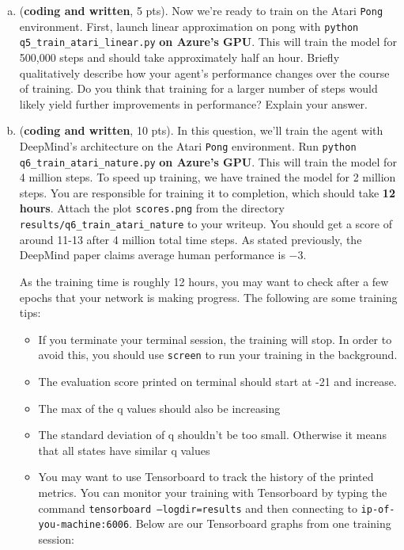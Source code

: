 \documentclass{article}
\newif\ifanswers
\newenvironment{myitemize}
{ \begin{itemize}
    \setlength{\itemsep}{0pt}
    \setlength{\parskip}{0pt}
    \setlength{\parsep}{0pt}     }
  { \end{itemize}                  }
\newcommand{\ifans}[1]{\ifanswers \color{red} \textbf{Solution: } #1 \color{black} \else {} \fi}
\begin{document}
\begin{enumerate}[(a)]
\item (\textbf{coding and written}, 5 pts). Now we're ready to train on the Atari \texttt{Pong} environment. First, launch linear approximation on pong with \texttt{python q5\_train\_atari\_linear.py} \textbf{on Azure's GPU}. This will train the model for 500,000 steps and should take approximately half an hour.  Briefly qualitatively describe how your agent's performance changes over the course of training. Do you think that training for a larger number of steps would likely yield further improvements in performance? Explain your answer.

\ifans{
}

\item (\textbf{coding and written}, 10 pts). In this question, we'll train the agent with DeepMind's architecture on the Atari \texttt{Pong} environment. Run \texttt{python q6\_train\_atari\_nature.py} \textbf{on Azure's GPU}.  This will train the model for 4 million steps. To speed up training, we have trained the model for 2 million steps. You are responsible for training it to completion, which should take \textbf{12 hours}. Attach the plot \texttt{scores.png} from the directory \texttt{results/q6\_train\_atari\_nature} to your writeup.
You should get a score of around 11-13 after 4 million total time steps.  As stated previously, the DeepMind paper claims average human performance is $ -3 $.


\ifans{
}

As the training time is roughly 12 hours, you may want to check after a few epochs that your network is making progress.  The following are some training tips:

\begin{myitemize}
\item If you terminate your terminal session, the training will stop.  In order to avoid this, you should use \texttt{screen} to run your training in the background.
\item The evaluation score printed on terminal should start at -21 and increase.
\item The max of the q values should also be increasing
\item The standard deviation of q shouldn't be too small. Otherwise it means that all states have similar q values
\item You may want to use Tensorboard to track the history of the printed metrics. You can monitor your training with Tensorboard by typing the command \texttt{tensorboard --logdir=results} and then connecting to \texttt{ip-of-you-machine:6006}.  Below are our Tensorboard graphs from one training session:
\end{myitemize}


\end{enumerate}
\end{document}
